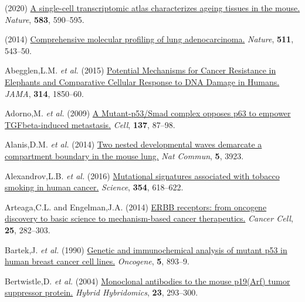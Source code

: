 \hypertarget{refs}{}
\begin{CSLReferences}{1}{0}
\leavevmode{}%
(2020) \href{https://doi.org/10.1038/s41586-020-2496-1}{A single-cell transcriptomic atlas characterizes ageing tissues in the mouse.} \emph{Nature}, \textbf{583}, 590--595.

\leavevmode{}%
(2014) \href{https://doi.org/10.1038/nature13385}{Comprehensive molecular profiling of lung adenocarcinoma.} \emph{Nature}, \textbf{511}, 543--50.

\leavevmode{}%
Abegglen,L.M. \emph{et al.} (2015) \href{https://doi.org/10.1001/jama.2015.13134}{Potential Mechanisms for Cancer Resistance in Elephants and Comparative Cellular Response to DNA Damage in Humans.} \emph{JAMA}, \textbf{314}, 1850--60.

\leavevmode{}%
Adorno,M. \emph{et al.} (2009) \href{https://doi.org/10.1016/j.cell.2009.01.039}{A Mutant-p53/Smad complex opposes p63 to empower TGFbeta-induced metastasis.} \emph{Cell}, \textbf{137}, 87--98.

\leavevmode{}%
Alanis,D.M. \emph{et al.} (2014) \href{https://doi.org/10.1038/ncomms4923}{Two nested developmental waves demarcate a compartment boundary in the mouse lung.} \emph{Nat Commun}, \textbf{5}, 3923.

\leavevmode{}%
Alexandrov,L.B. \emph{et al.} (2016) \href{https://doi.org/10.1126/science.aag0299}{Mutational signatures associated with tobacco smoking in human cancer.} \emph{Science}, \textbf{354}, 618--622.

\leavevmode{}%
Arteaga,C.L. and Engelman,J.A. (2014) \href{https://doi.org/10.1016/j.ccr.2014.02.025}{ERBB receptors: from oncogene discovery to basic science to mechanism-based cancer therapeutics.} \emph{Cancer Cell}, \textbf{25}, 282--303.

\leavevmode{}%
Bartek,J. \emph{et al.} (1990) \href{https://www.ncbi.nlm.nih.gov/pubmed/1694291}{Genetic and immunochemical analysis of mutant p53 in human breast cancer cell lines.} \emph{Oncogene}, \textbf{5}, 893--9.

\leavevmode{}%
Bertwistle,D. \emph{et al.} (2004) \href{https://doi.org/10.1089/hyb.2004.23.293}{Monoclonal antibodies to the mouse p19(Arf) tumor suppressor protein.} \emph{Hybrid Hybridomics}, \textbf{23}, 293--300.


\end{CSLReferences}

